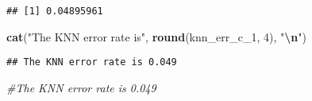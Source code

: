 \documentclass[
]{article}
\newenvironment{Shaded}{\begin{snugshade}}{\end{snugshade}}
\newcommand{\CommentTok}[1]{\textcolor[rgb]{0.56,0.35,0.01}{\textit{#1}}}
\newcommand{\DecValTok}[1]{\textcolor[rgb]{0.00,0.00,0.81}{#1}}
\newcommand{\FunctionTok}[1]{\textcolor[rgb]{0.13,0.29,0.53}{\textbf{#1}}}
\newcommand{\NormalTok}[1]{#1}
\newcommand{\SpecialCharTok}[1]{\textcolor[rgb]{0.81,0.36,0.00}{\textbf{#1}}}
\newcommand{\StringTok}[1]{\textcolor[rgb]{0.31,0.60,0.02}{#1}}
\begin{document}
\begin{verbatim}
## [1] 0.04895961
\end{verbatim}

\begin{Shaded}
\begin{Highlighting}[]
\FunctionTok{cat}\NormalTok{(}\StringTok{"The KNN error rate is"}\NormalTok{, }\FunctionTok{round}\NormalTok{(knn\_err\_c\_1, }\DecValTok{4}\NormalTok{), }\StringTok{"}\SpecialCharTok{\textbackslash{}n}\StringTok{"}\NormalTok{)}
\end{Highlighting}
\end{Shaded}

\begin{verbatim}
## The KNN error rate is 0.049
\end{verbatim}

\begin{Shaded}
\begin{Highlighting}[]
\CommentTok{\#The KNN error rate is 0.049 }
\end{Highlighting}
\end{Shaded}
\end{document}
